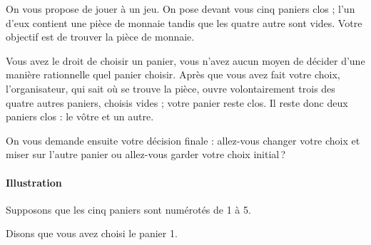             \begin{exe}\label{exe:proba-cours-6}
                  On vous propose de jouer \`a un jeu.
                  On pose devant vous cinq paniers clos ; 
                  l'un d'eux contient une pi\`ece de monnaie tandis que
                  les quatre autre sont vides.
                  Votre objectif est de trouver la pi\`ece de monnaie.
                  
                  Vous avez le droit de choisir un panier, 
                  vous n'avez aucun moyen de d\'ecider d'une mani\`ere rationnelle quel panier choisir.
                  Apr\`es que vous avez fait votre choix, l'organisateur, qui sait o\`u se trouve la pi\`ece,
                  ouvre volontairement trois des quatre autres paniers, choisis vides ;
                  votre panier reste clos.
                  Il reste donc deux paniers clos : le v\^otre et un autre.
                  
                  On vous demande ensuite votre d\'ecision finale : 
                        allez-vous changer votre choix et miser sur l'autre panier ou
                        allez-vous garder votre choix initial\,?
                        
                        \paragraph{Illustration}
                              Supposons que les cinq paniers sont num\'erot\'es de 1 \`a 5.
                              
                                    
                              Disons que vous avez choisi le panier 1.
                              
                                    

\end{exe}

